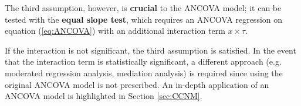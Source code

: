 \newl The third assumption, however, is \textbf{crucial} to the ANCOVA model; it can be tested with the \textbf{equal slope test}, which requires an ANCOVA regression on equation (\ref{eq:ANCOVA}) with an additional interaction term $x \times \tau$. \par If the interaction is not significant, the third assumption is satisfied. In the event that the interaction term is statistically significant, a different approach (e.g. moderated regression analysis, mediation analysis) is required since using the original ANCOVA model is not prescribed. \newl An in-depth application of an ANCOVA model is highlighted in Section \ref{sec:CCNM}.


